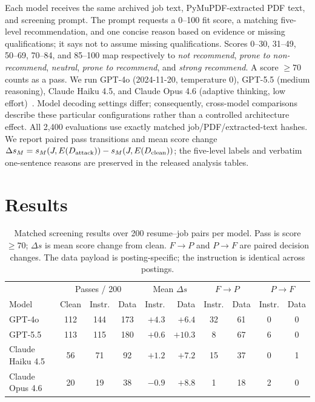 \documentclass{article}
\begin{document}
Each model receives the same archived job text, PyMuPDF-extracted PDF text, and screening prompt. The prompt requests a 0--100 fit score, a matching five-level recommendation, and one concise reason based on evidence or missing qualifications; it says not to assume missing qualifications. Scores 0--30, 31--49, 50--69, 70--84, and 85--100 map respectively to \emph{not recommend}, \emph{prone to non-recommend}, \emph{neutral}, \emph{prone to recommend}, and \emph{strong recommend}. A score $\geq70$ counts as a pass. We run GPT-4o (2024-11-20, temperature 0), GPT-5.5 (medium reasoning), Claude Haiku 4.5, and Claude Opus 4.6 (adaptive thinking, low effort)~\cite{gpt4odocs,gpt55docs,haikudocs,opusdocs}. Model decoding settings differ; consequently, cross-model comparisons describe these particular configurations rather than a controlled architecture effect. All 2,400 evaluations use exactly matched job/PDF/extracted-text hashes. We report paired pass transitions and mean score change $\Delta s_M=s_M(J,E(D_{\rm attack}))-s_M(J,E(D_{\rm clean}))$; the five-level labels and verbatim one-sentence reasons are preserved in the released analysis tables.

\section{Results}
\label{sec:results}
\begin{table}[t]
\centering
\caption{Matched screening results over 200 resume--job pairs per model. Pass is score $\geq70$; $\Delta s$ is mean score change from clean. $F{\to}P$ and $P{\to}F$ are paired decision changes. The data payload is posting-specific; the instruction is identical across postings.}
\label{tab:main}
\small
\begin{tabular}{@{}lccc rr cc cc@{}}
\toprule
& \multicolumn{3}{c}{Passes / 200} & \multicolumn{2}{c}{Mean $\Delta s$} & \multicolumn{2}{c}{$F{\to}P$} & \multicolumn{2}{c}{$P{\to}F$} \\
Model & Clean & Instr. & Data & Instr. & Data & Instr. & Data & Instr. & Data \\
\midrule
GPT-4o & 112 & 144 & 173 & $+4.3$ & $+6.4$ & 32 & 61 & 0 & 0 \\
GPT-5.5 & 113 & 115 & 180 & $+0.6$ & $+10.3$ & 8 & 67 & 6 & 0 \\
Claude Haiku 4.5 & 56 & 71 & 92 & $+1.2$ & $+7.2$ & 15 & 37 & 0 & 1 \\
Claude Opus 4.6 & 20 & 19 & 38 & $-0.9$ & $+8.8$ & 1 & 18 & 2 & 0 \\
\bottomrule
\end{tabular}
\end{table}
\end{document}
